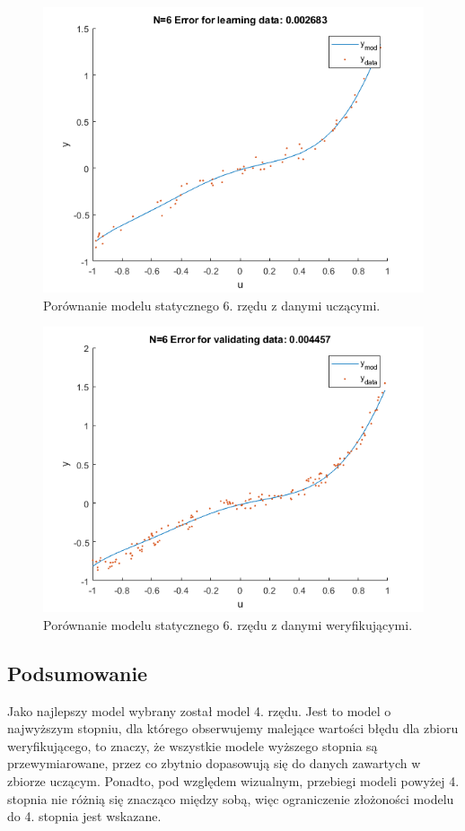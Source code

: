 \begin{figure}[H]
\centering
\includegraphics[width=15cm]{images/s11.png}
\caption{Porównanie modelu statycznego 6. rzędu z danymi uczącymi.}
\label{fig:s11}
\end{figure}
\begin{figure}[H]
\centering
\includegraphics[width=15cm]{images/s12.png}
\caption{Porównanie modelu statycznego 6. rzędu z danymi weryfikującymi.}
\label{fig:s12}
\end{figure}
\subsection{Podsumowanie}
Jako najlepszy model wybrany został model 4. rzędu. Jest to model o najwyższym stopniu, dla którego obserwujemy malejące wartości błędu dla zbioru weryfikującego, to znaczy, że wszystkie modele wyższego stopnia są przewymiarowane, przez co zbytnio dopasowują się do danych zawartych w zbiorze uczącym. Ponadto, pod względem wizualnym, przebiegi modeli powyżej 4. stopnia nie różnią się znacząco między sobą, więc ograniczenie złożoności modelu do 4. stopnia jest wskazane.
